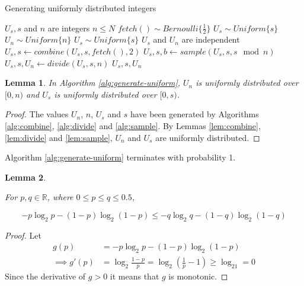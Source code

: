 \documentclass[12pt]{article}
\newtheorem{lemma}{Lemma}
\begin{document}
\begin{algorithm}
\caption{Generating uniformly distributed integers}
\label{alg:generate-uniform}
\begin{algorithmic}[1]
\Require $U_s, s$ and $n$ are integers
\Require $n \le N$
\Require $fetch() \sim Bernoulli\{\frac{1}{2}\}$
\Require $U_s \sim Uniform\{s\}$
\Ensure $U_n \sim Uniform\{n\}$
\Ensure $U_s \sim Uniform\{s\}$
\Ensure $U_s$ and $U_n$ are independent
        \State $U_s, s \gets combine(U_s, s, fetch(), 2)$
    \EndWhile
    \State $U_s, s, b \gets sample(U_s, s, s \mod n)$ 
        \State $U_s, s, U_n \gets divide(U_s, s, n)$
        \State \Return $U_s, s, U_n$
    \EndIf
  \EndWhile
\EndProcedure
\end{algorithmic}
\end{algorithm}

\begin{lemma}
    In Algorithm \ref{alg:generate-uniform}, 
$U_n$ is uniformly distributed over $[0,n)$ and 
$U_s$ is uniformly distributed over $[0,s)$.
\end{lemma}

\begin{proof}
The values $U_n$, $n$, $U_s$ and $s$ have been generated by Algorithms \ref{alg:combine}, \ref{alg:divide} and \ref{alg:sample}. By Lemmas \ref{lem:combine}, \ref{lem:divide} and \ref{lem:sample}, $U_n$ and $U_s$ are uniformly distributed.
\end{proof}

Algorithm \ref{alg:generate-uniform} terminates with probability 1.

\begin{lemma}
    \label{lem:shannon-inequality}

For $p,q \in \mathbb{R}$, where $0 \le p\le q \le 0.5$, 

\begin{equation}
-p\log_2 p - (1-p)\log_2(1-p) \le -q\log_2 q - (1-q)\log_2(1-q)
\end{equation}
\end{lemma}

\begin{proof}
    Let
    \begin{align}
        g(p) & = -p\log_2 p - (1-p)\log_2(1-p) \\
        \implies g'(p) & = \log_2\frac{1-p}{p} = \log_2(\frac{1}{p}-1) \ge \log_21 = 0 
    \end{align}
Since the derivative of $g>0$ it means that $g$ is monotonic.
\end{proof}
\end{document}
